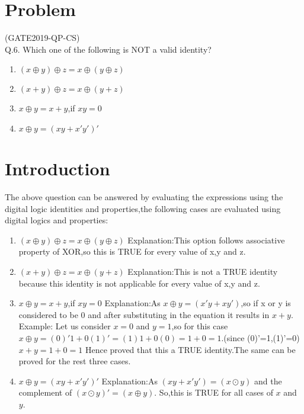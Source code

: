\documentclass[10pt,a4paper]{article}
\title{\mytitle}
\author{M Sai Sarath Chandra\\chandu.4567890@gmail.com\\FWC22117 IITH-Future Wireless Communications     Assignment-ARM}
\date{}
\begin{document}
\maketitle
\tableofcontents
\pagebreak
\section{Problem}
(GATE2019-QP-CS)\\
Q.6. Which one of the following is NOT a valid identity?
\begin{enumerate}
\item $(x \oplus y) \oplus z = x \oplus (y \oplus z)$
\item $(x + y) \oplus z = x \oplus (y + z)$
\item $x \oplus y = x + y$,if $xy = 0$
\item $x \oplus y = (xy +x'y')'$
\end{enumerate}
\section{Introduction}
The above question can be answered by evaluating the expressions using the digital logic identities and properties,the following cases are evaluated using digital logics and properties:
\begin{enumerate}
\item $(x \oplus y) \oplus z = x \oplus (y \oplus z)$\newline
Explanation:This option follows associative property of XOR,so this is TRUE for every value of x,y and z.
\item $(x + y) \oplus z = x \oplus (y + z)$\newline
Explanation:This is not a TRUE identity because this identity is not applicable for every value of x,y and z.
\item $x \oplus y = x + y$,if $xy = 0$\newline
Explanation:As $x \oplus y = (x'y + xy')$,so if x or y is considered to be 0 and after substituting in the equation it results in $x + y$.\newline
Example: Let us consider $x=0$ and $y=1$,so for this case \newline
$x \oplus y = (0)'1 + 0(1)' = (1)1 + 0(0) = 1 + 0 = 1.$(since (0)'=1,(1)'=0)\newline
$x + y = 1 + 0 = 1$\newline
Hence proved that this a TRUE identity.The same can be proved for the rest three cases.
\item $x \oplus y = (xy +x'y')'$\newline
Explanation:As $(xy + x'y') = (x \odot y)$ and the complement of $(x \odot y)' = (x \oplus y)$.\newline
So,this is TRUE for all cases of $x$ and $y$.
\end{enumerate}
\end{document}
